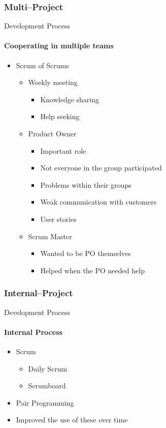 	\subsubsection{Multi--Project}
    \begin{frame}[t]{Development Process}\framesubtitle{Cooperating in multiple teams}
    \begin{itemize}
        \item Scrum of Scrums
        	\begin{itemize}
        		\item Weekly meeting
    			\begin{itemize}
        			\item Knowledge sharing 
        			\item Help seeking
        		\end{itemize}
        		\item Product Owner        			
    			\begin{itemize}
        			\item Important role
        			\item Not everyone in the group participated
        			\item Problems within their groups
        			\item Weak communication with customers
        			\item User stories
        		\end{itemize}
        		\item Scrum Master
        		\begin{itemize}
        			\item Wanted to be PO themselves
        			\item Helped when the PO needed help
        		\end{itemize}
    		\end{itemize}
    \end{itemize}
	\end{frame}
	 \subsubsection{Internal--Project}
	\begin{frame}[t]{Development Process}\framesubtitle{Internal Process}
    \begin{itemize}
        \item Scrum
        \begin{itemize}
        	\item Daily Scrum
        	\item Scrumboard
        \end{itemize}
        \item Pair Programming
        \bigskip
        \item Improved the use of these over time
    \end{itemize}
	\end{frame}
